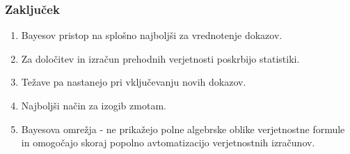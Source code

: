 \documentclass{beamer}
\begin{document}
\begin{frame}
   \frametitle{Zaključek}
   \begin{enumerate}
      \item Bayesov pristop na splošno najboljši za vrednotenje dokazov.
      \item Za določitev in izračun prehodnih verjetnosti poskrbijo statistiki.
      \item Težave pa nastanejo pri vključevanju novih dokazov.
      \item Najboljši način za izogib zmotam.
      \item Bayesova omrežja - ne prikažejo polne algebrske oblike verjetnostne formule in omogočajo skoraj popolno avtomatizacijo verjetnostnih izračunov.
   \end{enumerate}
\end{frame}
\end{document}
